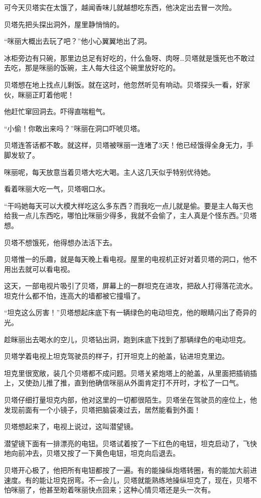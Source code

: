 \documentclass[a4paper,12pt,UTF8,twoside]{ctexbook}
\begin{document}
可今天贝塔实在太饿了，越闻香味儿就越想吃东西，他决定出去冒一次险。

贝塔先把头探出洞外，屋里静悄悄的。

“咪丽大概出去玩了吧？”他小心翼翼地出了洞。

冰柜旁边有只碗，那里边总足有好吃的，什么鱼呀、肉呀…贝塔就是饿死也不敢过去吃，那是咪丽的饭碗，主人每大往这个碗里放好吃的。

贝塔想在地上找点儿剩饭。就在这时，他忽然听见有响动。贝塔探头一看，好家伙，眯丽正盯着他呢！

他赶忙窜回洞去。吓得直喘粗气。

“小偷！你敢出来吗？”咪丽在洞口吓唬贝塔。

贝塔连答话都不敢。就这样，贝塔被咪丽一连堵了3天！他已经饿得全身无力，手脚发软了。

咪丽呢，每天放意当着贝塔大吃大喝。主人这几天似乎特别优待她。

看着咪丽大吃一气，贝塔咽口水。

“干吗她每天可以大模大样吃这么多东西？而我吃一点儿就是偷。要是主人每天也给我一点儿东西吃，哪怕比咪丽少得多，我就不会偷了，主人真是个怪东西。”贝塔想。

贝塔不想饿死，他得想办法活下去。

贝塔惟一的乐趣，就是每天晚上看电视。屋里的电视机正好对着贝塔的洞口，他不用出去就可以看电视。

这天，一部电视片吸引了贝塔，屏幕上的一群坦克在进攻，把敌人打得落花流水。坦克什么都不怕，连高大的墙都被它撞塌了。

“坦克这么厉害！”贝塔想起床底下有一辆绿色的电动坦克，他的眼睛闪出了奇异的光。

趁眯丽出去喝水的空儿，贝塔钻出洞，跑到床底下找到了那辆绿色的电动坦克。

贝塔学着电视上坦克驾驶员的样子，打开坦克上的舱盖，钻进坦克里边。

坦克里很宽敞，装几个贝塔都不成问题。贝塔关紧炮塔上的舱盖，从里面把插销插上，又使劲儿推了推，直到他确信咪丽从外面肯定打不开时，才松了一口气。

贝塔仔细打量坦克内部，他对这里的一切都很陌生。贝塔坐在驾驶员的座位上，他发现前面有一个小镜子，贝塔把脑袋凑过去，居然能看到外面！

贝塔想起来了，电视上说过，这叫潜望镜。

潜望镜下面有一排漂亮的电钮。贝塔试着按了一下红色的电钮，坦克启动了，飞快地向前冲去，贝塔又按了一下黄色电钮，坦克向后退去。

贝塔开心极了，他把所有电钮都按了一遍。有的能操纵炮塔转圈，有的能加大前进速度。有的能让坦克拐弯。不一会儿，贝塔就能熟练地操纵坦克了，现在，贝塔不怕咪丽了，他甚至盼着咪丽快点回来；这种心情贝塔还是头一次有。
\end{document}
